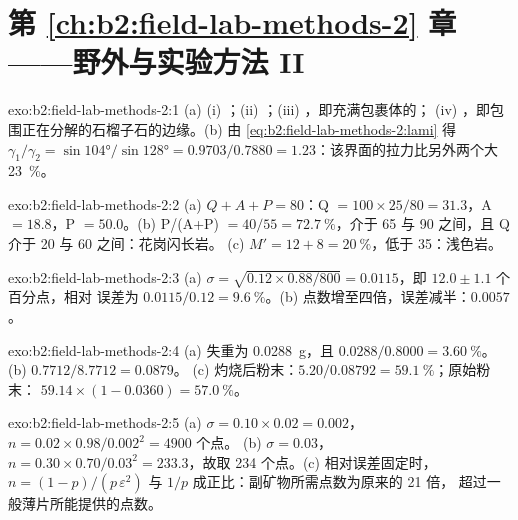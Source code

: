 \section*{第 \ref{ch:b2:field-lab-methods-2} 章——野外与实验方法 II}

\begin{solution}{exo:b2:field-lab-methods-2:1}
(a) (i) ；(ii) ；(iii) ，即充满包裹体的；
(iv) ，即包围正在分解的石榴子石的边缘。(b) 由
\eqref{eq:b2:field-lab-methods-2:lami} 得 $\gamma_1/\gamma_2 = \sin\ang{104}/\sin\ang{128} =
0.9703/0.7880 = 1.23$：该界面的拉力比另外两个大 \qty{23}{\percent}。
\end{solution}

\begin{solution}{exo:b2:field-lab-methods-2:2}
(a) $Q + A + P = 80$：Q $= 100 \times 25/80 = 31.3$，A $= 18.8$，P $= 50.0$。(b) P/(A+P) $=
40/55 = \qty{72.7}{\percent}$，介于 65 与 90 之间，且 Q 介于 20 与 60 之间：花岗闪长岩。
(c) $M' = 12 + 8 = \qty{20}{\percent}$，低于 35：浅色岩。
\end{solution}

\begin{solution}{exo:b2:field-lab-methods-2:3}
(a) $\sigma = \sqrt{0.12 \times 0.88/800} = 0.0115$，即 $12.0 \pm 1.1$ 个百分点，相对
误差为 $0.0115/0.12 = \qty{9.6}{\percent}$。(b) 点数增至四倍，误差减半：$0.0057$。
\end{solution}

\begin{solution}{exo:b2:field-lab-methods-2:4}
(a) 失重为 \qty{0.0288}{g}，且 $0.0288/0.8000 = \qty{3.60}{\percent}$。
(b) $0.7712/8.7712 = 0.0879$。
(c) 灼烧后粉末：$5.20/0.08792 = \qty{59.1}{\percent}$；原始粉末：
$59.14 \times (1 - 0.0360) = \qty{57.0}{\percent}$。
\end{solution}

\begin{solution}{exo:b2:field-lab-methods-2:5}
(a) $\sigma = 0.10 \times 0.02 = 0.002$，$n = 0.02 \times 0.98/0.002^2 = 4900$ 个点。
(b) $\sigma = 0.03$，$n = 0.30 \times 0.70/0.03^2 = 233.3$，故取 234 个点。(c) 相对误差固定时，
$n = (1-p)/(p\,\varepsilon^2)$ 与 $1/p$ 成正比：副矿物所需点数为原来的 21 倍，
超过一般薄片所能提供的点数。
\end{solution}

